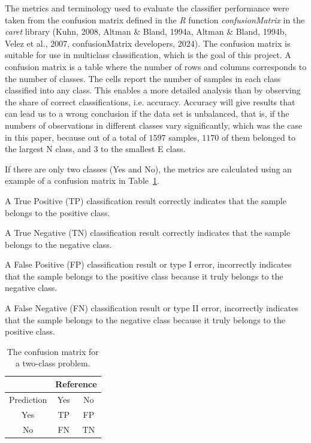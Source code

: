 \documentclass[sn-mathphys-num]{sn-jnl}%
\begin{document}
The metrics and terminology used to evaluate the classifier performance were taken from the confusion matrix defined in the \textit{R} function \textit{confusionMatrix} in the \textit{caret} library (Kuhn, 2008, Altman & Bland, 1994a, Altman & Bland, 1994b, Velez et al., 2007, confusionMatrix developers, 2024). The confusion matrix is suitable for use in multiclass classification, which is the goal of this project. A confusion matrix is a table where the number of rows and columns corresponds to the number of classes. The cells report the number of samples in each class classified into any class. This enables a more detailed analysis than by observing the share of correct classifications, i.e. accuracy. Accuracy will give results that can lead us to a wrong conclusion if the data set is unbalanced, that is, if the numbers of observations in different classes vary significantly, which was the case in this paper, because out of a total of $1597$ samples, $1170$ of them belonged to the largest N class, and $3$ to the smallest E class.

If there are only two classes (Yes and No), the metrics are calculated using an example of a confusion matrix in Table~\ref{tab:cm}.

A True Positive (TP) classification result correctly indicates that the sample belongs to the positive class.

A True Negative (TN) classification result correctly indicates that the sample belongs to the negative class.
 
A False Positive (FP) classification result or type I error, incorrectly indicates that the sample belongs to the positive class because it truly belongs to the negative class.

A False Negative (FN) classification result or type II error, incorrectly indicates that the sample belongs to the negative class because it truly belongs to the positive class.

\begin{table}[!ht]
    \centering
    \caption{The confusion matrix for a two-class problem.}
	\label{tab:cm}
	\begin{tabular}{|c|c|c|}
		\hline
		 & \multicolumn{2}{|c|}{Reference} \\ \hline
        Prediction & Yes & No \\ \hline
        Yes &TP & FP \\ \hline
        No & FN & TN \\ \hline
	\end{tabular}
\end{table}
\end{document}
